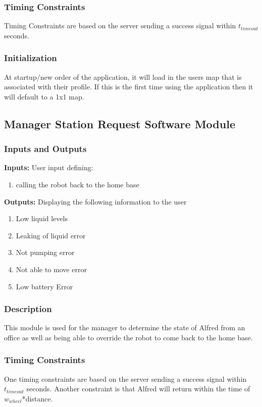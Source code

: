 \documentclass [10pt]{article}
\begin{document}
\subsubsection{Timing Constraints}
Timing Constraints are based on the server sending a success signal within  $ t_{timeout} $ seconds.

\subsubsection{Initialization}
At startup/new order of the application, it will load in the users map that is associated with their profile. If this is the first time using the application then it will default to a 1x1 map.

\subsection{Manager Station Request Software Module}

\subsubsection{Inputs and Outputs}

\textbf{Inputs: } User input defining:
\begin{enumerate}
	\item calling the robot back to the home base
\end{enumerate}

\textbf{Outputs: } Displaying the following information to the user
\begin{enumerate}
	\item Low liquid levels
	\item Leaking of liquid error
	\item Not pumping error
	\item Not able to move error
	\item Low battery Error
\end{enumerate}
\subsubsection{Description}
This module is used for the manager to determine the state of Alfred from an office as well as being able to override the robot to come back to the home base. 
\subsubsection{Timing Constraints}
One timing constraints are based on the server sending a success signal within  $ t_{timeout} $ seconds. Another constraint is that Alfred will return within the time of $ w_{wheel} $*distance.
\end{document}
